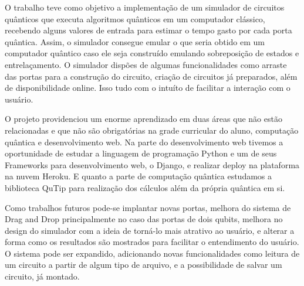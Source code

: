 \documentclass[a4paper, 12pt, oneside]{book}
\begin{document}
O trabalho teve como objetivo a implementação de um simulador de circuitos quânticos que executa algoritmos quânticos em um computador clássico, recebendo alguns valores de entrada para estimar o tempo gasto por cada porta quântica. Assim, o simulador consegue emular o que seria obtido em um computador quântico caso ele seja construído emulando sobreposição de estados e entrelaçamento. O simulador dispões de algumas funcionalidades como arraste das portas para a construção do circuito, criação de circuitos já preparados, além de disponibilidade online. Isso tudo com o intuíto de facilitar a interação com o usuário.

O projeto providenciou um enorme aprendizado em duas áreas que não estão relacionadas e que não são obrigatórias na grade curricular do aluno, computação quântica e desenvolvimento web. Na parte do desenvolvimento web tivemos a oportunidade de estudar a linguagem de programação Python e um de seus Frameworks para desenvolvimento web, o Django, e realizar deploy na plataforma na nuvem Heroku. E quanto a parte de computação quântica estudamos a biblioteca QuTip para realização dos cálculos além da própria quântica em si. 

Como trabalhos futuros pode-se implantar novas portas, melhora do sistema de Drag and Drop principalmente no caso das portas de dois qubits, melhora no design do simulador com a ideia de torná-lo mais atrativo ao usuário, e alterar a forma como os resultados são mostrados para facilitar o entendimento do usuário. O sistema pode ser expandido, adicionando novas funcionalidades como leitura de um circuito a partir de algum tipo de arquivo, e a possibilidade de salvar um circuito, já montado.



\end{document}
